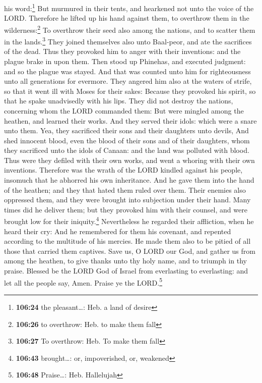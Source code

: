 his word:\footnote{\textbf{106:24} the pleasant\ldots: Heb. a land of
  desire}  But murmured in their tents, and hearkened not
unto the voice of the LORD.  Therefore he lifted up his
hand against them, to overthrow them in the wilderness:\footnote{\textbf{106:26}
  to overthrow: Heb. to make them fall}  To overthrow
their seed also among the nations, and to scatter them in the
lands.\footnote{\textbf{106:27} To overthrow: Heb. To make them fall}
 They joined themselves also unto Baal-peor, and ate the
sacrifices of the dead.  Thus they provoked him to anger
with their inventions: and the plague brake in upon them.
 Then stood up Phinehas, and executed judgment: and so
the plague was stayed.  And that was counted unto him for
righteousness unto all generations for evermore.  They
angered him also at the waters of strife, so that it went ill with Moses
for their sakes:  Because they provoked his spirit, so
that he spake unadvisedly with his lips.  They did not
destroy the nations, concerning whom the LORD commanded them:
 But were mingled among the heathen, and learned their
works.  And they served their idols: which were a snare
unto them.  Yea, they sacrificed their sons and their
daughters unto devils,  And shed innocent blood, even the
blood of their sons and of their daughters, whom they sacrificed unto
the idols of Canaan: and the land was polluted with blood.
 Thus were they defiled with their own works, and went a
whoring with their own inventions.  Therefore was the
wrath of the LORD kindled against his people, insomuch that he abhorred
his own inheritance.  And he gave them into the hand of
the heathen; and they that hated them ruled over them. 
Their enemies also oppressed them, and they were brought into subjection
under their hand.  Many times did he deliver them; but
they provoked him with their counsel, and were brought low for their
iniquity.\footnote{\textbf{106:43} brought\ldots: or, impoverished, or,
  weakened}  Nevertheless he regarded their affliction,
when he heard their cry:  And he remembered for them his
covenant, and repented according to the multitude of his mercies.
 He made them also to be pitied of all those that carried
them captives.  Save us, O LORD our God, and gather us
from among the heathen, to give thanks unto thy holy name, and to
triumph in thy praise.  Blessed be the LORD God of Israel
from everlasting to everlasting: and let all the people say, Amen.
Praise ye the LORD.\footnote{\textbf{106:48} Praise\ldots: Heb.
  Hallelujah}

